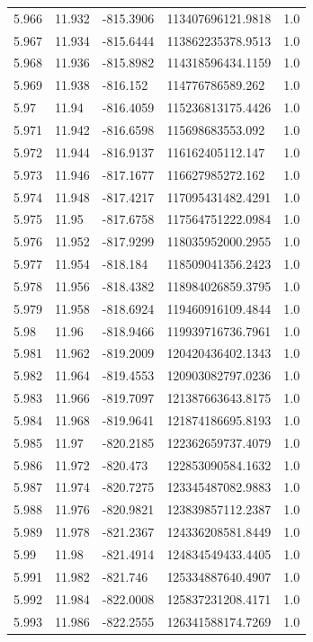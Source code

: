 \begin{tabular}{lllll}
5.966 & 11.932 & -815.3906 & 113407696121.9818 & 1.0 \\
5.967 & 11.934 & -815.6444 & 113862235378.9513 & 1.0 \\
5.968 & 11.936 & -815.8982 & 114318596434.1159 & 1.0 \\
5.969 & 11.938 & -816.152 & 114776786589.262 & 1.0 \\
5.97 & 11.94 & -816.4059 & 115236813175.4426 & 1.0 \\
5.971 & 11.942 & -816.6598 & 115698683553.092 & 1.0 \\
5.972 & 11.944 & -816.9137 & 116162405112.147 & 1.0 \\
5.973 & 11.946 & -817.1677 & 116627985272.162 & 1.0 \\
5.974 & 11.948 & -817.4217 & 117095431482.4291 & 1.0 \\
5.975 & 11.95 & -817.6758 & 117564751222.0984 & 1.0 \\
5.976 & 11.952 & -817.9299 & 118035952000.2955 & 1.0 \\
5.977 & 11.954 & -818.184 & 118509041356.2423 & 1.0 \\
5.978 & 11.956 & -818.4382 & 118984026859.3795 & 1.0 \\
5.979 & 11.958 & -818.6924 & 119460916109.4844 & 1.0 \\
5.98 & 11.96 & -818.9466 & 119939716736.7961 & 1.0 \\
5.981 & 11.962 & -819.2009 & 120420436402.1343 & 1.0 \\
5.982 & 11.964 & -819.4553 & 120903082797.0236 & 1.0 \\
5.983 & 11.966 & -819.7097 & 121387663643.8175 & 1.0 \\
5.984 & 11.968 & -819.9641 & 121874186695.8193 & 1.0 \\
5.985 & 11.97 & -820.2185 & 122362659737.4079 & 1.0 \\
5.986 & 11.972 & -820.473 & 122853090584.1632 & 1.0 \\
5.987 & 11.974 & -820.7275 & 123345487082.9883 & 1.0 \\
5.988 & 11.976 & -820.9821 & 123839857112.2387 & 1.0 \\
5.989 & 11.978 & -821.2367 & 124336208581.8449 & 1.0 \\
5.99 & 11.98 & -821.4914 & 124834549433.4405 & 1.0 \\
5.991 & 11.982 & -821.746 & 125334887640.4907 & 1.0 \\
5.992 & 11.984 & -822.0008 & 125837231208.4171 & 1.0 \\
5.993 & 11.986 & -822.2555 & 126341588174.7269 & 1.0 \\

\end{tabular}
